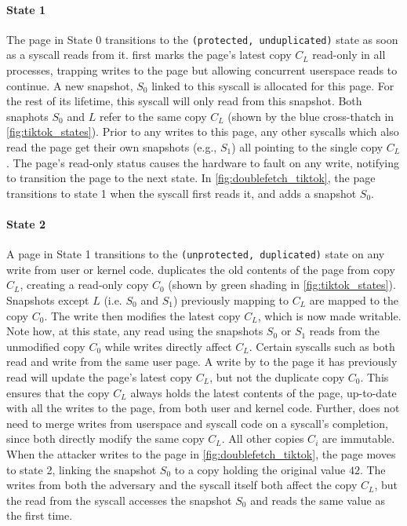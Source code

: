 \documentclass[letterpaper,twocolumn,10pt, anonymous]{article}
\begin{document}
\paragraph{State 1}
The page in State 0 transitions to the \texttt{(protected, unduplicated)} state as soon as a syscall 
reads from it.
\tiktok first marks the page's latest copy $C_L$ read-only in all processes, 
trapping writes to the page but allowing concurrent userspace reads to continue.
A new snapshot, $S_0$ linked to this syscall is allocated for this page.
For the rest of its lifetime, this syscall will only read from this snapshot.
Both snaphots $S_0$ and $L$ refer to the same copy $C_L$ (shown by the 
blue cross-thatch in \autoref{fig:tiktok_states}).
Prior to any writes to this page, any other syscalls which also read the page  
get their own snapshots (e.g., $S_1$) all pointing to the single copy $C_L$.
The page's read-only status causes the hardware to fault on any write,
notifying \tiktok to transition the page to the next state.
In \autoref{fig:doublefetch_tiktok}, the page transitions to state 1 when 
the syscall first reads it, and adds a snapshot $S_0$.

\paragraph{State 2}
A page in State 1 transitions to the \texttt{(unprotected, duplicated)} state 
on any write from user or kernel code.
\tiktok duplicates the old contents of the page from copy $C_L$, creating a 
read-only copy $C_0$ (shown by green shading in \autoref{fig:tiktok_states}).
Snapshots except $L$ (i.e. $S_0$ and $S_1$) previously mapping to $C_L$ are 
mapped to the copy $C_0$.
The write then modifies the latest copy $C_L$, which is now made writable.
Note how, at this state, any read using the snapshots $S_0$ or $S_1$ reads 
from the unmodified copy $C_0$ while writes directly affect $C_L$.
Certain syscalls such as  both read and write from 
the same user page. 
A write by  to the page it has previously read will update
the page's latest copy $C_L$, but not the duplicate copy $C_0$.
This ensures that the copy $C_L$ always holds the latest contents of the page, 
up-to-date with all the writes to the page, from both user and kernel code. 
Further, \tiktok does not need to merge writes from userspace and syscall code
on a syscall's completion, since both directly modify the same copy $C_L$.
All other copies $C_i$ are immutable.
When the attacker writes to the page in \autoref{fig:doublefetch_tiktok}, the
page moves to state 2, linking the snapshot $S_0$ to a copy holding the 
original value $42$.
The writes from both the adversary and the syscall itself both affect 
the copy $C_L$, but the read from the syscall accesses the snapshot $S_0$
and reads the same value as the first time.
\end{document}
